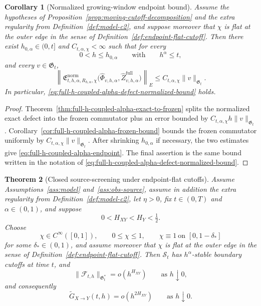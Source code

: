 \documentclass[11pt,a4paper]{amsart}
\theoremstyle{plain}
\newtheorem{theorem}{Theorem}[section]
\newtheorem{corollary}[theorem]{Corollary}
\theoremstyle{definition}
\theoremstyle{remark}
\begin{document}
\begin{corollary}[Normalized growing-window endpoint bound]
\label{cor:full-h-coupled-alpha-endpoint}
Assume the hypotheses of Proposition~\ref{prop:moving-cutoff-decomposition} and the extra
regularity from Definition~\ref{def:model-c2}, and suppose moreover
that \(\chi\) is flat at the outer edge in the sense of Definition~\ref{def:endpoint-flat-cutoff}.
Then there exist \(h_{0,\alpha}\in(0,t]\) and \(C_{t,\alpha,\chi}<\infty\) such that for every
\[
0<h\le h_{0,\alpha}
\qquad\text{with}\qquad
h^\alpha\le t,
\]
and every \(v\in\mathfrak G_t\),
\begin{equation}\label{eq:full-h-coupled-alpha-endpoint}
\left\|
\mathfrak E_{t,h,\alpha,R_{h,\alpha},\chi}^{\mathrm{norm}}
\bigl(
\widehat\Phi_{v,h,\alpha},
\widehat Z_{v,h,\alpha}^{\mathrm{full}}
\bigr)
\right\|_{E}
\le
C_{t,\alpha,\chi}\|v\|_{\mathfrak G_t}.
\end{equation}
In particular, \eqref{eq:full-h-coupled-alpha-defect-normalized-bound} holds.
\end{corollary}

\begin{proof}
Theorem~\ref{thm:full-h-coupled-alpha-exact-to-frozen} splits the normalized exact defect into the
frozen commutator plus an error bounded by
\(C_{t,\alpha,\chi}h\|v\|_{\mathfrak G_t}\).  Corollary~\ref{cor:full-h-coupled-alpha-frozen-bound}
bounds the frozen commutator uniformly by \(C_{t,\alpha,\chi}\|v\|_{\mathfrak G_t}\).  After
shrinking \(h_{0,\alpha}\) if necessary, the two estimates give
\eqref{eq:full-h-coupled-alpha-endpoint}.  The final assertion is the same bound written in the
notation of \eqref{eq:full-h-coupled-alpha-defect-normalized-bound}.
\end{proof}

\begin{theorem}[Closed source-screening under endpoint-flat cutoffs]
\label{thm:observable-screening-closed}\label{cor:full-h-coupled-alpha-closed}
Assume Assumptions~\ref{ass:model} and~\ref{ass:obs-source}, assume in addition the extra
regularity from Definition~\ref{def:model-c2}, let \(\eta>0\), fix \(t\in(0,T)\) and
\(\alpha\in(0,1)\), and suppose
\[
0<H_{XY}<H_Y<\tfrac12.
\]
Choose
\[
\chi\in C^\infty([0,1]),
\qquad
0\le\chi\le1,
\qquad
\chi\equiv1\ \text{on }[0,1-\delta_*]
\]
for some \(\delta_*\in(0,1)\), and assume moreover that \(\chi\) is flat at the outer edge in the
sense of Definition~\ref{def:endpoint-flat-cutoff}. Then \(\mathcal S_t\) has
\(h^\alpha\)-stable boundary cutoffs at time \(t\), and
\begin{equation}\label{eq:observable-screening-closed-F}
\|\mathcal F_{t,h}\|_{\mathfrak G_t^*}
=
o(h^{H_{XY}})
\qquad\text{as }h\downarrow0,
\end{equation}
and consequently
\begin{equation}\label{eq:observable-screening-closed-G}
\widetilde G_{X\to Y}(t,h)
=
o(h^{2H_{XY}})
\qquad\text{as }h\downarrow0.
\end{equation}
\end{theorem}
\end{document}
